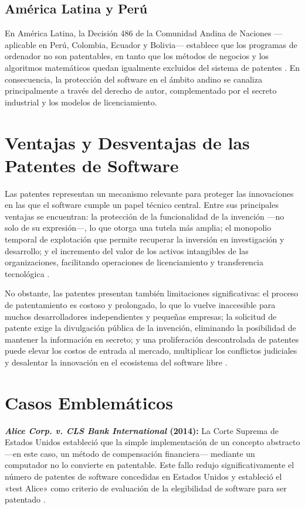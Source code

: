 \documentclass[11pt,a4paper]{report}
\begin{document}
\subsection{América Latina y Perú}

En América Latina, la Decisión 486 de la Comunidad Andina de Naciones —aplicable en Perú, Colombia, Ecuador y Bolivia— establece que los programas de ordenador no son patentables, en tanto que los métodos de negocios y los algoritmos matemáticos quedan igualmente excluidos del sistema de patentes \citep{indecopi2023}. En consecuencia, la protección del software en el ámbito andino se canaliza principalmente a través del derecho de autor, complementado por el secreto industrial y los modelos de licenciamiento.

\section{Ventajas y Desventajas de las Patentes de Software}

Las patentes representan un mecanismo relevante para proteger las innovaciones en las que el software cumple un papel técnico central. Entre sus principales ventajas se encuentran: la protección de la funcionalidad de la invención —no solo de su expresión—, lo que otorga una tutela más amplia; el monopolio temporal de explotación que permite recuperar la inversión en investigación y desarrollo; y el incremento del valor de los activos intangibles de las organizaciones, facilitando operaciones de licenciamiento y transferencia tecnológica \citep{ompi2024}.

No obstante, las patentes presentan también limitaciones significativas: el proceso de patentamiento es costoso y prolongado, lo que lo vuelve inaccesible para muchos desarrolladores independientes y pequeñas empresas; la solicitud de patente exige la divulgación pública de la invención, eliminando la posibilidad de mantener la información en secreto; y una proliferación descontrolada de patentes puede elevar los costos de entrada al mercado, multiplicar los conflictos judiciales y desalentar la innovación en el ecosistema del software libre \citep{euipo2022, indecopi2023}.

\section{Casos Emblemáticos}

\textbf{\textit{Alice Corp. v. CLS Bank International} (2014):} La Corte Suprema de Estados Unidos estableció que la simple implementación de un concepto abstracto —en este caso, un método de compensación financiera— mediante un computador no lo convierte en patentable. Este fallo redujo significativamente el número de patentes de software concedidas en Estados Unidos y estableció el «test Alice» como criterio de evaluación de la elegibilidad de software para ser patentado \citep{uspto2024}.
\end{document}

